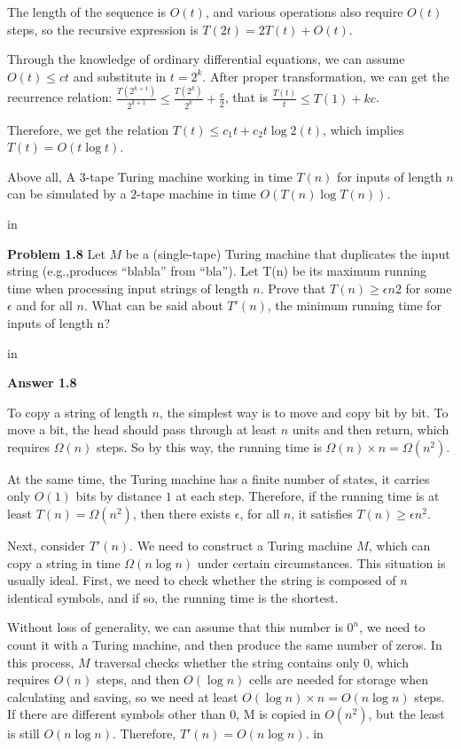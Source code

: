 \documentclass[11pt]{article}
\begin{document}
The length of the sequence is $O(t)$, and various operations also require $O(t)$ steps, so the recursive expression is $T(2t)=2T(t)+O(t)$.

Through the knowledge of ordinary differential equations, we can assume $O(t)\leq ct$ and substitute in $t=2^k$. After proper transformation, we can get the recurrence relation: $\frac{T(2^{k+1})}{2^{k+1}}\leq\frac{T(2^{k })}{2^k}+\frac{c}{2}$, that is $\frac{T(t)}{t}\leq T(1) + kc$.

Therefore, we get the relation $T(t) \leq c_1t+c_2t\log2(t)$, which implies $T(t) = O(t\log t)$. 

Above all, A $3$-tape Turing machine working in time $T(n)$ for inputs of length $n$
can be simulated by a $2$-tape machine in time $O(T(n) \log T(n))$.

 in

\newpage
{\bf Problem 1.8} Let $M$ be a (single-tape) Turing machine that duplicates the input string (e.g.,produces ``blabla'' from ``bla''). Let T(n) be its maximum running time when processing
input strings of length $n$. Prove that $T(n) \geq \epsilon n2$ for some $\epsilon$ and for all $n$. What can be said about $T'(n)$, the minimum running time for inputs of length n?

 in


{\bf Answer 1.8 }

To copy a string of length $n$, the simplest way is to move and copy bit by bit. To move a bit, the head should pass through at least $n$ units and then return, which requires $\Omega(n)$ steps. So by this way, the running time is $\Omega(n) \times n = \Omega(n^2)$. 

At the same time, the Turing machine has a finite number of states, it carries only $O(1)$ bits by distance $1$ at each step. Therefore, if the running time is at least $T(n)=\Omega(n^2)$, then there exists $\epsilon$,  for all $n$, it satisfies $T(n)\geq \epsilon n^2$.

Next, consider $T'(n)$. We need to construct a Turing machine $M$, which can copy a string in time $\Omega(n\log n)$ under certain circumstances. This situation is usually ideal. First, we need to check whether the string is composed of $n$ identical symbols, and if so, the running time is the shortest. 

Without loss of generality, we can assume that this number is $0^n$, we need to count it with a Turing machine, and then produce the same number of zeros. In this process, $M$ traversal checks whether the string contains only $0$, which requires $O(n)$ steps, and then $O(\log n)$ cells are needed for storage when calculating and saving, so we need at least $O(\log n)\times n=O(n\log n)$ steps. If there are different symbols other than $0$, M is copied in $O(n^2)$, but the least is still $O(n\log n)$. Therefore, $T'(n)=O(n\log n)$.
 in
\end{document}
